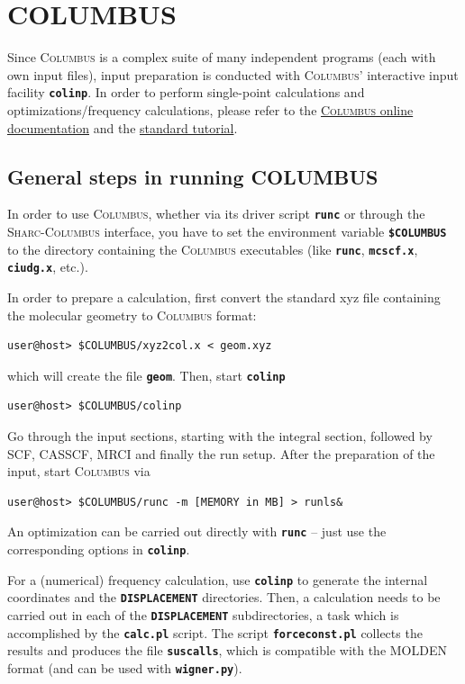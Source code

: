 \documentclass[a4paper,11pt,DIV=15,openany]{scrbook}
\newcommand{\sharc}{\textsc{Sharc}}
\newcommand{\ttt}[1]{\textbf{\texttt{#1}}}
\begin{document}
\section{COLUMBUS}

Since \textsc{Columbus} is a complex suite of many independent programs (each with own input files), input preparation is conducted with \textsc{Columbus}' interactive input facility \ttt{colinp}. In order to perform single-point calculations and optimizations/frequency calculations, please refer to the 
\href{http://www.univie.ac.at/columbus/docs_COL70/documentation_main.html}{\textsc{Columbus} online documentation} and the 
\href{http://www.univie.ac.at/columbus/docs_COL70/tutorial.pdf}{standard tutorial}.

\subsection{General steps in running COLUMBUS}

In order to use \textsc{Columbus}, whether via its driver script \ttt{runc} or through the \sharc-\textsc{Columbus} interface, you have to set the environment variable \ttt{\$COLUMBUS} to the directory containing the \textsc{Columbus} executables (like \ttt{runc}, \ttt{mcscf.x}, \ttt{ciudg.x}, etc.).

In order to prepare a calculation, first convert the standard xyz file containing the molecular geometry to \textsc{Columbus} format:
\begin{verbatim}
user@host> $COLUMBUS/xyz2col.x < geom.xyz
\end{verbatim}
which will create the file \ttt{geom}. Then, start \ttt{colinp}
\begin{verbatim}
user@host> $COLUMBUS/colinp
\end{verbatim}

Go through the input sections, starting with the integral section, followed by SCF, CASSCF, MRCI and finally the run setup. After the preparation of the input, start \textsc{Columbus} via
\begin{verbatim}
user@host> $COLUMBUS/runc -m [MEMORY in MB] > runls&
\end{verbatim}
An optimization can be carried out directly with \ttt{runc} -- just use the corresponding options in \ttt{colinp}.

For a (numerical) frequency calculation, use \ttt{colinp} to generate the internal coordinates and the \ttt{DISPLACEMENT} directories. Then, a calculation needs to be carried out in each of the \ttt{DISPLACEMENT} subdirectories, a task which is accomplished by the \ttt{calc.pl} script. The script \ttt{forceconst.pl} collects the results and produces the file \ttt{suscalls}, which is compatible with the MOLDEN format (and can be used with \ttt{wigner.py}).
\end{document}
